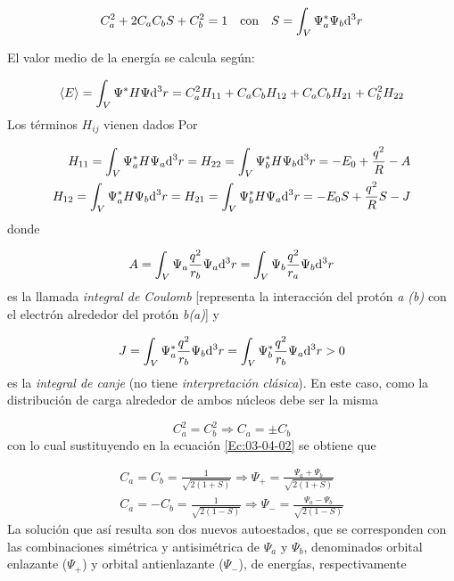 \begin{equation}
    C_a^2 + 2 C_a C_b S + C_b^2 = 1 \quad \text{con} \quad S = \int_V \Psi_a^* \Psi_b \mathrm{d}^3 r \label{Ec:03-04-02}
\end{equation}

El valor medio de la energía se calcula según:

\begin{equation}
    \langle E \rangle = \int_V \Psi^* H \Psi \mathrm{d}^3 r = C_a^2 H_{11} + C_a C_b H_{12} + C_a C_b H_{21} + C_b^2 H_{22} \label{Ec:03-04-03}
\end{equation}
Los términos $H_{ij}$ vienen dados Por

\begin{align*}
    H_{11} = \int_V \Psi_a^* H \Psi_a \mathrm{d}^3 r = H_{22} = \int_V \Psi_b^* H \Psi_b \mathrm{d}^3 r = - E_0 + \frac{q^2}{R}-A \\
    H_{12} = \int_V \Psi_a^* H \Psi_b \mathrm{d}^3 r = H_{21} = \int_V \Psi_b^* H \Psi_a \mathrm{d}^3 r = - E_0 S + \frac{q^2}{R}S-J \\
\end{align*}
donde 

\begin{equation*}
    A = \int_V \Psi_a \frac{q^2}{r_b} \Psi_a \mathrm{d}^3 r  = \int_V \Psi_b \frac{q^2}{r_a} \Psi_b \mathrm{d}^3 r
\end{equation*}
es la llamada \textit{integral de Coulomb} [representa la interacción del protón \textit{a (b)} con el electrón alrededor del protón \textit{b(a)}] y

\begin{equation*}
    J = \int_V \Psi_a^* \frac{q^2}{r_b} \Psi_b \mathrm{d}^3 r = \int_V \Psi_b^* \frac{q^2}{r_b} \Psi_a \mathrm{d}^3 r > 0
\end{equation*}
es la \textit{integral de canje} (no tiene \textit{interpretación clásica}). En este caso, como la distribución de carga alrededor de ambos núcleos debe ser la misma

\begin{equation*}
    C_a^2 = C_b^2 \Rightarrow C_a = \pm C_b
\end{equation*}
con lo cual sustituyendo en la ecuación \ref{Ec:03-04-02} se obtiene que

\begin{align}
    C_a = C_b = \frac{1}{\sqrt{2(1+S)}} \Rightarrow \Psi_+ = \frac{\Psi_a+\Psi_b}{\sqrt{2(1+S)}} \\
    C_a = -  C_b = \frac{1}{\sqrt{2(1-S)}} \Rightarrow \Psi_- = \frac{\Psi_a-\Psi_b}{\sqrt{2(1-S)}} 
\end{align}
La solución que así resulta son dos nuevos autoestados, que se corresponden con las combinaciones simétrica y antisimétrica de $\Psi_a$ y $\Psi_b$, denominados orbital enlazante ($\Psi_+$) y orbital antienlazante ($\Psi_-$), de energías, respectivamente 

